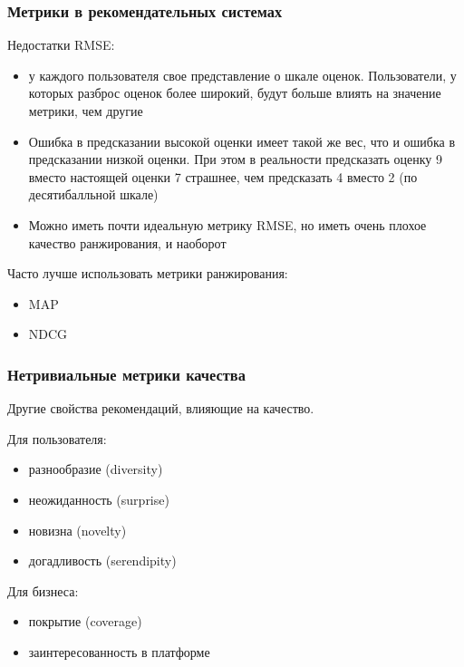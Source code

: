\documentclass[fullscreen=true, bookmarks=true, hyperref={pdfencoding=unicode}]{beamer}
\begin{document}
\begin{frame}
  \frametitle{Метрики в рекомендательных системах}

  Недостатки RMSE:
  \begin{itemize}
    \item у каждого пользователя свое представление о шкале оценок. Пользователи, у которых разброс оценок более широкий, будут больше влиять на значение метрики, чем другие
    \item Ошибка в предсказании высокой оценки имеет такой же вес, что и ошибка в предсказании низкой оценки. При этом в реальности предсказать оценку 9 вместо настоящей оценки 7 страшнее, чем предсказать 4 вместо 2 (по десятибалльной шкале)
    \item Можно иметь почти идеальную метрику RMSE, но иметь очень плохое качество ранжирования, и наоборот
  \end{itemize}

  Часто лучше использовать метрики ранжирования:
  \begin{itemize}
   \item MAP
   \item NDCG
  \end{itemize}
\end{frame}


\begin{frame}
  \frametitle{Нетривиальные метрики качества}

  Другие свойства рекомендаций, влияющие на качество.

  \vspace{0.5cm}
  Для пользователя:
  \begin{itemize}
    \item разнообразие (diversity)
    \item неожиданность (surprise)
    \item новизна (novelty)
    \item догадливость (serendipity)
  \end{itemize}

  \vspace{0.5cm}
  Для бизнеса:
  \begin{itemize}
    \item покрытие (coverage)
    \item заинтересованность в платформе
  \end{itemize}
\end{frame}
\end{document}
